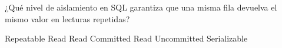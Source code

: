 \question[1] ¿Qué nivel de aislamiento en SQL garantiza que una misma fila devuelva el mismo valor en lecturas repetidas?
\begin{choices}
\CorrectChoice Repeatable Read
\choice Read Committed
\choice Read Uncommitted
\choice Serializable
\end{choices}